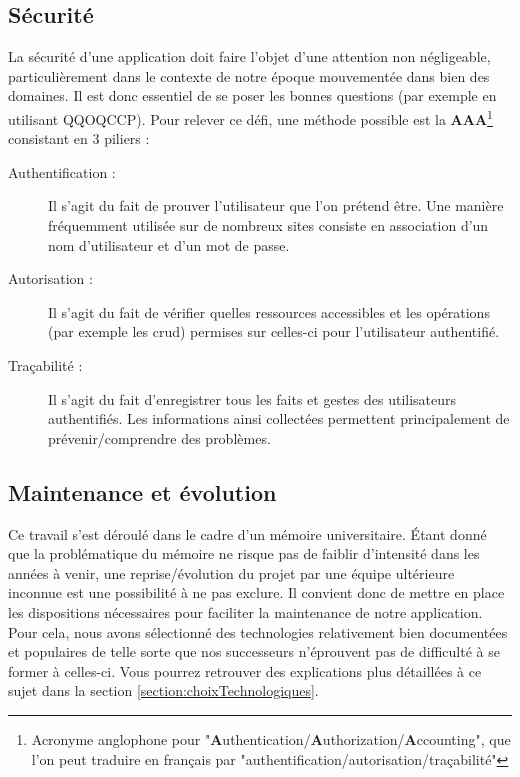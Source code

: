 \subsection*{Sécurité}

La sécurité d'une application doit faire l'objet d'une attention non négligeable, particulièrement dans le contexte de notre époque mouvementée dans bien des domaines. Il est donc essentiel de se poser les bonnes questions (par exemple en utilisant \Gls{QQOQCCP}). Pour relever ce défi, une méthode possible est la \textbf{AAA}\footnote{Acronyme anglophone pour "\textbf{A}uthentication/\textbf{A}uthorization/\textbf{A}ccounting", que l'on peut traduire en français par "authentification/autorisation/traçabilité" }
consistant en 3 piliers : 

\begin{description}
    \item[Authentification :] Il s'agit du fait de prouver l'utilisateur que l'on prétend être. Une manière fréquemment utilisée sur de nombreux sites consiste en association d'un nom d'utilisateur et d'un mot de passe.
    \item[Autorisation :] Il s'agit du fait de vérifier quelles ressources accessibles et les opérations (par exemple les \Gls{crud}) permises sur celles-ci pour l'utilisateur authentifié.
    \item[Traçabilité :] Il s'agit du fait d'enregistrer tous les faits et gestes des utilisateurs authentifiés. Les informations ainsi collectées permettent principalement de prévenir/comprendre des problèmes. 
\end{description}


\subsection*{Maintenance et évolution}

Ce travail s'est déroulé dans le cadre d'un mémoire universitaire. Étant donné que la problématique du mémoire ne risque pas de faiblir d'intensité dans les années à venir, une reprise/évolution du projet par une équipe ultérieure inconnue est une possibilité à ne pas exclure. Il convient donc de mettre en place les dispositions nécessaires pour faciliter la maintenance de notre application. \\

Pour cela, nous avons sélectionné des technologies relativement bien documentées et populaires de telle sorte que nos successeurs n'éprouvent pas de difficulté à se former à celles-ci. Vous pourrez retrouver des explications plus détaillées à ce sujet dans la section \ref{section:choixTechnologiques}.


